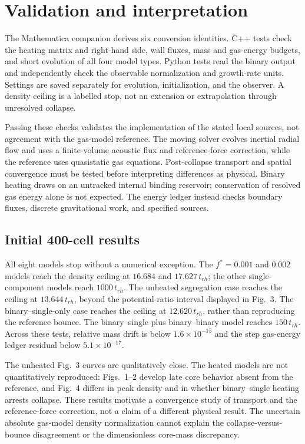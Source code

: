 \documentclass[11pt]{article}
\begin{document}
\section{Validation and interpretation}
The Mathematica companion derives six conversion identities. C++ tests
check the heating matrix and right-hand side, wall fluxes, mass and gas-energy
budgets, and short evolution of all four model types. Python tests read
the binary output and independently check the observable normalization
and growth-rate units. Settings are saved separately for evolution,
initialization, and the observer. A density ceiling is a labelled stop,
not an extension or extrapolation through unresolved collapse.

Passing these checks validates the implementation of the stated local
sources, not agreement with the gas-model reference. The moving solver
evolves inertial radial flow and uses a finite-volume acoustic flux and
reference-force correction, while the reference uses quasistatic gas
equations. Post-collapse transport and spatial convergence must be tested
before interpreting differences as physical. Binary heating draws on an
untracked internal binding reservoir; conservation of resolved gas energy
alone is not expected. The energy ledger instead checks boundary fluxes,
discrete gravitational work, and specified sources.
\subsection{Initial 400-cell results}
All eight models stop without a numerical exception. The $f^*=0.001$ and
$0.002$ models reach the density ceiling at $16.684$ and $17.627\,t_{rh}$;
the other single-component models reach $1000\,t_{rh}$. The unheated
segregation case reaches the ceiling at $13.644\,t_{rh}$, beyond the
potential-ratio interval displayed in Fig.~3. The binary--single-only
case reaches the ceiling at $12.620\,t_{rh}$, rather than reproducing the
reference bounce. The binary--single plus binary--binary model reaches
$150\,t_{rh}$. Across these tests, relative mass drift is below
$1.6\times10^{-15}$ and the step gas-energy ledger residual below
$5.1\times10^{-17}$.

The unheated Fig.~3 curves are qualitatively close. The heated models
are not quantitatively reproduced: Figs.~1--2 develop late core behavior
absent from the reference, and Fig.~4 differs in peak density and in
whether binary--single heating arrests collapse. These results motivate
a convergence study of transport and the reference-force correction,
not a claim of a different physical result. The uncertain absolute
gas-model density normalization cannot explain the collapse-versus-bounce
disagreement or the dimensionless core-mass discrepancy.
\end{document}
